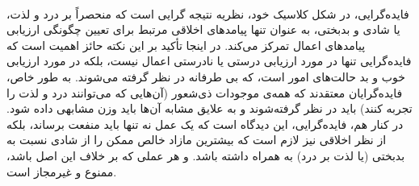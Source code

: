 \paragraph{}
فایده‌گرایی، در شکل کلاسیک خود، نظریه نتیجه گرایی است که منحصراً بر درد و لذت، یا شادی و بدبختی، به عنوان تنها پیامدهای اخلاقی مرتبط برای تعیین چگونگی ارزیابی پیامدهای اعمال تمرکز می‌کند.
در اینجا تأکید بر این نکته حائز اهمیت است که فایده‌گرایی تنها در مورد ارزیابی درستی یا نادرستی اعمال نیست، بلکه در مورد ارزیابی خوب و بد حالت‌های امور است، که بی طرفانه در نظر گرفته می‌شوند.
به طور خاص، فایده‌گرایان معتقدند که همه‌ی موجودات ذی‌شعور (آن‌هایی که می‌توانند درد و لذت را تجربه کنند) باید در نظر گرفته‌شوند و به علایق مشابه آن‌ها باید وزن مشابهی داده شود.
در کنار هم، فایده‌گرایی، این دیدگاه است که یک عمل نه تنها باید منفعت برساند، بلکه از نظر اخلاقی نیز لازم است که بیشترین مازاد خالص ممکن را از شادی نسبت به بدبختی (یا لذت بر درد) به همراه داشته باشد.
و هر عملی که بر خلاف این اصل باشد، ممنوع و غیرمجاز است.

\newpage

